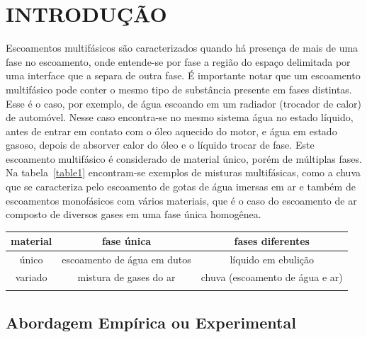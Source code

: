 \typeout{ ====================================================================}
\typeout{ ====================================================================}


\section{INTRODUÇÃO}

Escoamentos multifásicos são caracterizados quando há presença de mais
de uma fase no escoamento, onde entende-se por fase a região do espaço
delimitada por uma interface que a separa de outra fase. É importante
notar que um escoamento multifásico pode conter o mesmo tipo de
substância presente em fases distintas. Esse é o caso, por exemplo, de
água escoando em um radiador (trocador de calor) de automóvel. Nesse
caso encontra-se no mesmo sistema água no estado líquido, antes de
entrar em contato com o óleo aquecido do motor, e água em estado gasoso,
depois de absorver calor do óleo e o líquido trocar de fase. Este
escoamento multifásico é considerado de material único, porém de
múltiplas fases. Na tabela~\ref{table1} encontram-se exemplos de
misturas multifásicas, como a chuva que se caracteriza pelo escoamento
de gotas de água imersas em ar e também de escoamentos monofásicos com
vários materiais, que é o caso do escoamento de ar composto de diversos
gases em uma fase única homogênea.

\begin{center}
  \begin{tabular}{ccc}
    \hline
    material & fase única  & fases diferentes \\
    \hline
    único    & escoamento de água em dutos & líquido em ebulição \\
    variado  & mistura de gases do ar      & chuva (escoamento de água e ar)  \\
    \hline\\
  \end{tabular}
  \label{table1}
\end{center}


\subsection{Abordagem Empírica ou Experimental}

